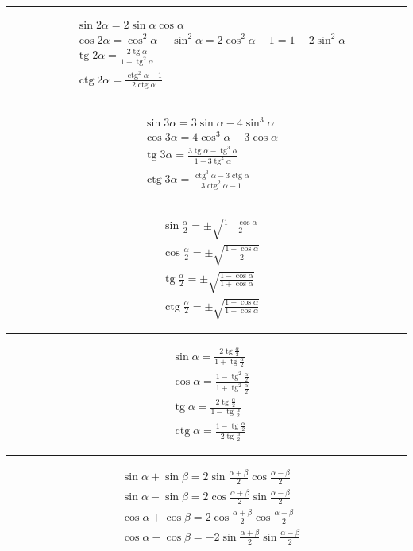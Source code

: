 \documentclass[12pt,a4paper,fleqn]{article}
\DeclareMathOperator{\tg}{tg}
\DeclareMathOperator{\ctg}{ctg}
\begin{document}
	\noindent\rule{10cm}{0.4pt}
	\begin{align*}
		&\sin2\alpha = 2\sin\alpha\cos\alpha\\
		&\cos2\alpha = \cos^2\alpha-\sin^2\alpha = 2\cos^2\alpha - 1 = 1-2\sin^2\alpha\\
		&\tg2\alpha = \frac{2\tg \alpha}{1 - \tg^2 \alpha}\\
		&\ctg2\alpha = \frac{\ctg^2\alpha-1}{2\ctg\alpha}
	\end{align*}
		
	\noindent\rule{10cm}{0.4pt}
	\begin{align*}
		&\sin3\alpha = 3\sin\alpha -4\sin^3\alpha\\
		&\cos3\alpha = 4\cos^3\alpha -3\cos\alpha\\
		&\tg3\alpha = \frac{3\tg\alpha-\tg^3\alpha}{1-3\tg^2\alpha}\\
		&\ctg3\alpha = \frac{\ctg^3\alpha - 3\ctg\alpha}{3\ctg^2\alpha-1}
	\end{align*}
	
	\noindent\rule{10cm}{0.4pt}
	\begin{align*}
		&\sin\frac{\alpha}{2} = \pm \sqrt{\frac{1-\cos\alpha}{2}}\\
		&\cos\frac{\alpha}{2} = \pm \sqrt{\frac{1+\cos\alpha}{2}}\\
		&\tg\frac{\alpha}{2} = \pm \sqrt{\frac{1-\cos\alpha}{1+\cos\alpha}}\\
		&\ctg\frac{\alpha}{2} = \pm \sqrt{\frac{1+\cos\alpha}{1-\cos\alpha}}
	\end{align*}
	
	\noindent\rule{10cm}{0.4pt}
	\begin{align*}
	&\sin\alpha = \frac{2\tg\frac{\alpha}{2}}{1+\tg\frac{\alpha}{2}}\\
	&\cos\alpha = \frac{1-\tg^2\frac{\alpha}{2}}{1+\tg^2\frac{\alpha}{2}}\\
	&\tg\alpha = \frac{2\tg\frac{\alpha}{2}}{1-\tg\frac{\alpha}{2}}\\
	&\ctg\alpha = \frac{1-\tg\frac{\alpha}{2}}{2\tg\frac{\alpha}{2}}
	\end{align*}
	
	\noindent\rule{10cm}{0.4pt}
	\begin{align*}
	&\sin\alpha + \sin \beta =2\sin\frac{\alpha+\beta}{2}\cos\frac{\alpha-\beta}{2} \\
	&\sin\alpha - \sin \beta =2\cos\frac{\alpha+\beta}{2}\sin\frac{\alpha-\beta}{2} \\
	&\cos\alpha + \cos \beta =2\cos\frac{\alpha+\beta}{2}\cos\frac{\alpha-\beta}{2} \\
	&\cos\alpha - \cos \beta =-2\sin\frac{\alpha+\beta}{2}\sin\frac{\alpha-\beta}{2} 
	\end{align*}
	
\end{document}
